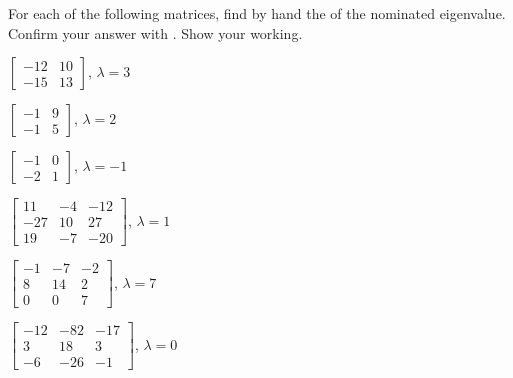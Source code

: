\begin{exercise}  
For each of the following matrices, find by hand the  of the nominated eigenvalue.  
Confirm your answer with \script.  
Show your working.  
\begin{Parts}
\item \(\begin{bmatrix} -12 & 10
\\-15 & 13 \end{bmatrix}\), \(\lambda=3\)

\item \(\begin{bmatrix} -1 & 9
\\-1 & 5 \end{bmatrix}\), \(\lambda=2\)

\begin{OmitV1}
\item \(\begin{bmatrix} -1 & 0
\\-2 & 1 \end{bmatrix}\), \(\lambda=-1\)

\item \(\begin{bmatrix} 11 & -4 & -12
\\-27 & 10 & 27
\\19 & -7 & -20 \end{bmatrix}\), \(\lambda=1\)

\item \(\begin{bmatrix} -1 & -7 & -2
\\8 & 14 & 2
\\0 & 0 & 7 \end{bmatrix}\), \(\lambda=7\)
\end{OmitV1}

\item \(\begin{bmatrix} -12 & -82 & -17
\\3 & 18 & 3
\\-6 & -26 & -1 \end{bmatrix}\), \(\lambda=0\)


\end{Parts}
\end{exercise}
